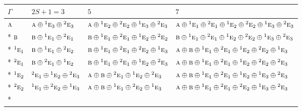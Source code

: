 \documentclass[10pt,a4paper]{article}
\numberwithin{equation}{section}
\newcommand{\irr}[1]{\text{\normalfont\scshape #1}}
\newcommand{\conjpair}[1]{{}^{#1}}
\begin{document}
{\small\setlength{\tabcolsep}{3pt}\begin{longtable}{@{}llll@{}}\toprule
$\Gamma$ & $2S + 1 = 3$ & $5$ & $7$\\\midrule\endhead
\bottomrule\endfoot\endlastfoot
$\irr{a}$ & $\irr{a}\oplus \conjpair{1}\irr{e}_{3}\oplus \conjpair{2}\irr{e}_{3}$ & $\irr{a}\oplus \conjpair{1}\irr{e}_{2}\oplus \conjpair{2}\irr{e}_{2}\oplus \conjpair{1}\irr{e}_{3}\oplus \conjpair{2}\irr{e}_{3}$ & $\irr{a}\oplus \conjpair{1}\irr{e}_{1}\oplus \conjpair{2}\irr{e}_{1}\oplus \conjpair{1}\irr{e}_{2}\oplus \conjpair{2}\irr{e}_{2}\oplus \conjpair{1}\irr{e}_{3}\oplus \conjpair{2}\irr{e}_{3}$\\*
$\irr{b}$ & $\irr{b}\oplus \conjpair{1}\irr{e}_{1}\oplus \conjpair{2}\irr{e}_{1}$ & $\irr{b}\oplus \conjpair{1}\irr{e}_{1}\oplus \conjpair{2}\irr{e}_{1}\oplus \conjpair{1}\irr{e}_{2}\oplus \conjpair{2}\irr{e}_{2}$ & $\irr{b}\oplus \conjpair{1}\irr{e}_{1}\oplus \conjpair{2}\irr{e}_{1}\oplus \conjpair{1}\irr{e}_{2}\oplus \conjpair{2}\irr{e}_{2}\oplus \conjpair{1}\irr{e}_{3}\oplus \conjpair{2}\irr{e}_{3}$\\*
$\conjpair{1}\irr{e}_{1}$ & $\irr{b}\oplus \conjpair{1}\irr{e}_{1}\oplus \conjpair{2}\irr{e}_{2}$ & $\irr{b}\oplus \conjpair{1}\irr{e}_{1}\oplus \conjpair{2}\irr{e}_{1}\oplus \conjpair{2}\irr{e}_{2}\oplus \conjpair{1}\irr{e}_{3}$ & $\irr{a}\oplus \irr{b}\oplus \conjpair{1}\irr{e}_{1}\oplus \conjpair{2}\irr{e}_{1}\oplus \conjpair{1}\irr{e}_{2}\oplus \conjpair{2}\irr{e}_{2}\oplus \conjpair{1}\irr{e}_{3}$\\*
$\conjpair{2}\irr{e}_{1}$ & $\irr{b}\oplus \conjpair{2}\irr{e}_{1}\oplus \conjpair{1}\irr{e}_{2}$ & $\irr{b}\oplus \conjpair{1}\irr{e}_{1}\oplus \conjpair{2}\irr{e}_{1}\oplus \conjpair{1}\irr{e}_{2}\oplus \conjpair{2}\irr{e}_{3}$ & $\irr{a}\oplus \irr{b}\oplus \conjpair{1}\irr{e}_{1}\oplus \conjpair{2}\irr{e}_{1}\oplus \conjpair{1}\irr{e}_{2}\oplus \conjpair{2}\irr{e}_{2}\oplus \conjpair{2}\irr{e}_{3}$\\*
$\conjpair{1}\irr{e}_{2}$ & $\conjpair{2}\irr{e}_{1}\oplus \conjpair{1}\irr{e}_{2}\oplus \conjpair{2}\irr{e}_{3}$ & $\irr{a}\oplus \irr{b}\oplus \conjpair{2}\irr{e}_{1}\oplus \conjpair{1}\irr{e}_{2}\oplus \conjpair{2}\irr{e}_{3}$ & $\irr{a}\oplus \irr{b}\oplus \conjpair{1}\irr{e}_{1}\oplus \conjpair{2}\irr{e}_{1}\oplus \conjpair{1}\irr{e}_{2}\oplus \conjpair{1}\irr{e}_{3}\oplus \conjpair{2}\irr{e}_{3}$\\*
$\conjpair{2}\irr{e}_{2}$ & $\conjpair{1}\irr{e}_{1}\oplus \conjpair{2}\irr{e}_{2}\oplus \conjpair{1}\irr{e}_{3}$ & $\irr{a}\oplus \irr{b}\oplus \conjpair{1}\irr{e}_{1}\oplus \conjpair{2}\irr{e}_{2}\oplus \conjpair{1}\irr{e}_{3}$ & $\irr{a}\oplus \irr{b}\oplus \conjpair{1}\irr{e}_{1}\oplus \conjpair{2}\irr{e}_{1}\oplus \conjpair{2}\irr{e}_{2}\oplus \conjpair{1}\irr{e}_{3}\oplus \conjpair{2}\irr{e}_{3}$\\*

\end{longtable}}
\end{document}
